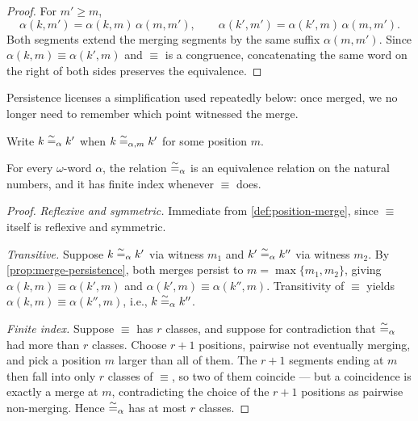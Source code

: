 \begin{proof}
For $m'\geq m$,
\[
  \alpha(k,m') = \alpha(k,m)\,\alpha(m,m'),
  \qquad
  \alpha(k',m') = \alpha(k',m)\,\alpha(m,m').
\]
Both segments extend the merging segments by the same suffix
$\alpha(m,m')$.  Since $\alpha(k,m)\equiv\alpha(k',m)$ and $\equiv$ is
a congruence, concatenating the same word on the right of both sides
preserves the equivalence.
\end{proof}


Persistence licenses a simplification used repeatedly below: once
merged, we no longer need to remember which point witnessed the merge.

\begin{definition}
\label{def:eventual-merge}
Write $k\mathrel{\overset{\sim}{=}_{\alpha}}k'$ when $k\mathrel{\overset{\sim}{=}_{\alpha,m}}k'$ for some
position $m$.
\end{definition}

\begin{lemma}
\label{lem:eventual-merge-finite-index}
For every $\omega$-word $\alpha$, the relation $\mathrel{\overset{\sim}{=}_{\alpha}}$ is
an equivalence relation on the natural numbers, and it has finite
index whenever $\equiv$ does.
\end{lemma}

\begin{proof}
\emph{Reflexive and symmetric.}  Immediate from
\cref{def:position-merge}, since $\equiv$ itself is reflexive and
symmetric.

\emph{Transitive.}  Suppose $k\mathrel{\overset{\sim}{=}_{\alpha}}k'$ via witness $m_1$
and $k'\mathrel{\overset{\sim}{=}_{\alpha}}k''$ via witness $m_2$.  By
\cref{prop:merge-persistence}, both merges persist to
$m=\max\{m_1,m_2\}$, giving $\alpha(k,m)\equiv\alpha(k',m)$ and
$\alpha(k',m)\equiv\alpha(k'',m)$.  Transitivity of $\equiv$ yields
$\alpha(k,m)\equiv\alpha(k'',m)$, i.e., $k\mathrel{\overset{\sim}{=}_{\alpha}}k''$.

\emph{Finite index.}  Suppose $\equiv$ has $r$ classes, and suppose for
contradiction that $\mathrel{\overset{\sim}{=}_{\alpha}}$ had more than $r$ classes.  Choose
$r+1$ positions, pairwise not eventually merging, and pick a position
$m$ larger than all of them.  The $r+1$ segments ending at $m$ then
fall into only $r$ classes of $\equiv$, so two of them coincide --- but
a coincidence is exactly a merge at $m$, contradicting the choice of
the $r+1$ positions as pairwise non-merging.  Hence $\mathrel{\overset{\sim}{=}_{\alpha}}$
has at most $r$ classes.
\end{proof}

